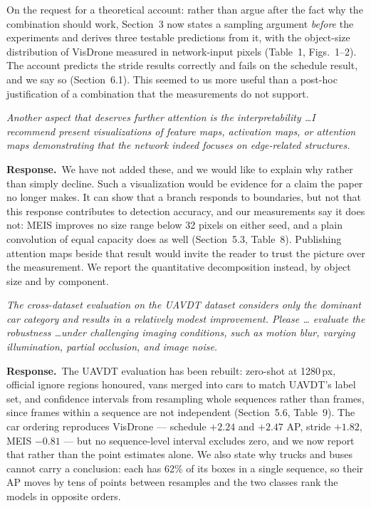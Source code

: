 \documentclass[11pt, a4paper]{article}
\newcommand{\point}[1]{\medskip\noindent\textit{#1}\par}
\newcommand{\reply}{\textbf{Response.}\ }
\begin{document}
On the request for a theoretical account: rather than argue after the fact why
the combination should work, Section~3 now states a sampling argument
\emph{before} the experiments and derives three testable predictions from it, with
the object-size distribution of VisDrone measured in network-input pixels
(Table~1, Figs.~1--2). The account predicts the stride results correctly and fails
on the schedule result, and we say so (Section~6.1). This seemed to us more useful
than a post-hoc justification of a combination that the measurements do not
support.

\point{Another aspect that deserves further attention is the interpretability
\dots I recommend present visualizations of feature maps, activation maps, or
attention maps demonstrating that the network indeed focuses on edge-related
structures.}

\reply We have not added these, and we would like to explain why rather than
simply decline. Such a visualization would be evidence for a claim the paper no
longer makes. It can show that a branch responds to boundaries, but not that this
response contributes to detection accuracy, and our measurements say it does not:
MEIS improves no size range below 32 pixels on either seed, and a plain
convolution of equal capacity does as well (Section~5.3, Table~8). Publishing
attention maps beside that result would invite the reader to trust the picture
over the measurement. We report the quantitative decomposition instead, by object
size and by component.

\point{The cross-dataset evaluation on the UAVDT dataset considers only the
dominant car category and results in a relatively modest improvement. Please \dots
evaluate the robustness \dots under challenging imaging conditions, such as motion
blur, varying illumination, partial occlusion, and image noise.}

\reply The UAVDT evaluation has been rebuilt: zero-shot at 1280\,px, official
ignore regions honoured, vans merged into cars to match UAVDT's label set, and
confidence intervals from resampling whole sequences rather than frames, since
frames within a sequence are not independent (Section~5.6, Table~9). The car
ordering reproduces VisDrone --- schedule $+2.24$ and $+2.47$ AP, stride $+1.82$,
MEIS $-0.81$ --- but no sequence-level interval excludes zero, and we now report
that rather than the point estimates alone. We also state why trucks and buses
cannot carry a conclusion: each has 62\% of its boxes in a single sequence, so
their AP moves by tens of points between resamples and the two classes rank the
models in opposite orders.
\end{document}
